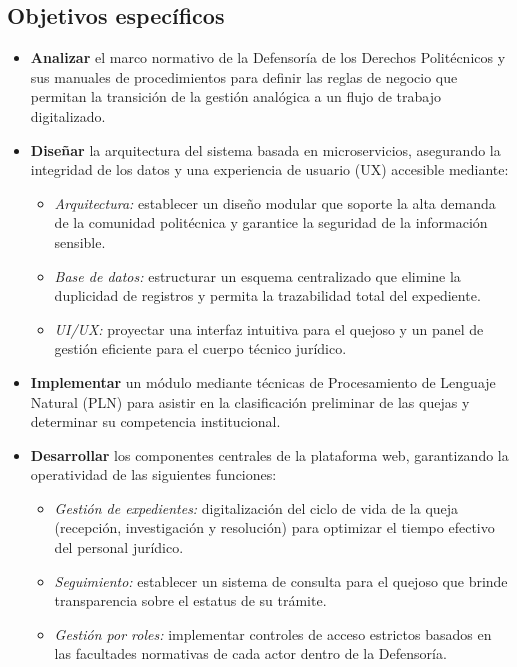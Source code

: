 \subsection{Objetivos específicos}
\begin{itemize}
    \item \textbf{Analizar} el marco normativo de la Defensoría de los Derechos Politécnicos y sus manuales de procedimientos para definir las reglas de negocio que permitan la transición de la gestión analógica a un flujo de trabajo digitalizado.

    \item \textbf{Diseñar} la arquitectura del sistema basada en microservicios, asegurando la integridad de los datos y una experiencia de usuario (UX) accesible mediante:
    \begin{itemize}
        \item \textit{Arquitectura:} establecer un diseño modular que soporte la alta demanda de la comunidad politécnica y garantice la seguridad de la información sensible.
        \item \textit{Base de datos:} estructurar un esquema centralizado que elimine la duplicidad de registros y permita la trazabilidad total del expediente.
        \item \textit{UI/UX:} proyectar una interfaz intuitiva para el quejoso y un panel de gestión eficiente para el cuerpo técnico jurídico.
    \end{itemize}

    \item \textbf{Implementar} un módulo mediante técnicas de Procesamiento de Lenguaje Natural (PLN) para asistir en la clasificación preliminar de las quejas y determinar su competencia institucional.

    \item \textbf{Desarrollar} los componentes centrales de la plataforma web, garantizando la operatividad de las siguientes funciones:
    \begin{itemize}
        \item \textit{Gestión de expedientes:} digitalización del ciclo de vida de la queja (recepción, investigación y resolución) para optimizar el tiempo efectivo del personal jurídico.
        \item \textit{Seguimiento:} establecer un sistema de consulta para el quejoso que brinde transparencia sobre el estatus de su trámite.
        \item \textit{Gestión por roles:} implementar controles de acceso estrictos basados en las facultades normativas de cada actor dentro de la Defensoría.
    \end{itemize}
\end{itemize}

